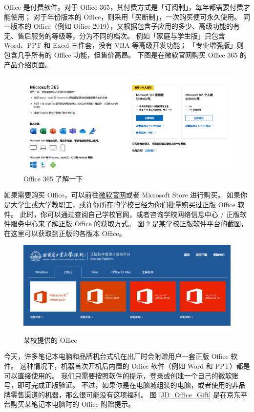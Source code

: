 Office 是付费软件。对于 Office 365，其付费方式是「订阅制」，每年都需要付费才能使用；
对于年份版本的 Office，则采用「买断制」，一次购买便可永久使用。
同一版本的 Office（例如 Office 2019），又根据包含子应用的多少、高级功能的有无、售后服务的等级等，分为不同的档次。
例如「家庭与学生版」只包含 Word、PPT 和 Excel 三件套，没有 VBA 等高级开发功能；
「专业增强版」则包含几乎所有的 Office 功能，但售价高昂。
下图是在微软官网购买 Office 365 的产品介绍页面。

\begin{figure}[htb!]
  \centering
  \includegraphics[width=12cm]{assets/Office_365.png}
  \caption{Office 365 了解一下}
  \label{Office_365}
\end{figure}

如果需要购买 Office，可以前往\href{https://www.microsoft.com/zh-CN/microsoft-365/buy/microsoft-365}{微软官网}或者 Microsoft Store 进行购买。
如果你是大学生或大学教职工，或许你所在的学校已经为你们批量购买过正版 Office 软件。
此时，你可以通过查阅自己学校官网，或者咨询学校网络信息中心 / 正版软件服务中心来了解正版 Office 的获取方式。
图 \ref{College_Office} 是某学校正版软件平台的截图，在这里可以获取到正版的各版本 Office。

\begin{figure}[htb!]
  \centering
  \includegraphics[width=12cm]{assets/College_Office.png}
  \caption{某校提供的 Office}
  \label{College_Office}
\end{figure}

今天，许多笔记本电脑和品牌机台式机在出厂时会附赠用户一套正版 Office 软件。
这种情况下，机器首次开机后内置的 Office 软件（例如 Word 和 PPT）都是可以直接使用的。
我们只需要按照软件的提示，登录或创建一个自己的微软账号，即可完成正版验证。
不过，如果你是在电脑城组装的电脑，或者使用的非品牌零售渠道的机器，那么很可能没有这项福利。
图 \ref{JD_Office_Gift} 是在京东平台购买某笔记本电脑时的 Office 附赠提示。

